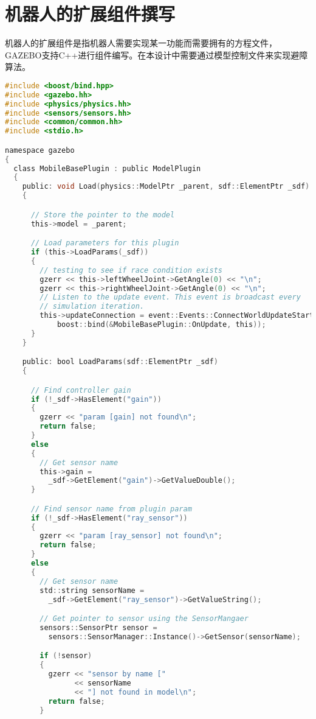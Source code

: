 \section{机器人的扩展组件撰写}
机器人的扩展组件是指机器人需要实现某一功能而需要拥有的方程文件，GAZEBO支持C++进行组件编写。在本设计中需要通过模型控制文件来实现避障算法。\\
\begin{lstlisting}[language={C}, caption={机器人控制扩展组件}]
#include <boost/bind.hpp>
#include <gazebo.hh>
#include <physics/physics.hh>
#include <sensors/sensors.hh>
#include <common/common.hh>
#include <stdio.h>

namespace gazebo
{   
  class MobileBasePlugin : public ModelPlugin
  {
    public: void Load(physics::ModelPtr _parent, sdf::ElementPtr _sdf) 
    {

      // Store the pointer to the model
      this->model = _parent;

      // Load parameters for this plugin
      if (this->LoadParams(_sdf))
      {
        // testing to see if race condition exists
        gzerr << this->leftWheelJoint->GetAngle(0) << "\n";
        gzerr << this->rightWheelJoint->GetAngle(0) << "\n";
        // Listen to the update event. This event is broadcast every
        // simulation iteration.
        this->updateConnection = event::Events::ConnectWorldUpdateStart(
            boost::bind(&MobileBasePlugin::OnUpdate, this));
      }
    }

    public: bool LoadParams(sdf::ElementPtr _sdf) 
    {

      // Find controller gain
      if (!_sdf->HasElement("gain"))
      {
        gzerr << "param [gain] not found\n";
        return false;
      }
      else
      {
        // Get sensor name
        this->gain =
          _sdf->GetElement("gain")->GetValueDouble();
      }

      // Find sensor name from plugin param
      if (!_sdf->HasElement("ray_sensor"))
      {
        gzerr << "param [ray_sensor] not found\n";
        return false;
      }
      else
      {
        // Get sensor name
        std::string sensorName =
          _sdf->GetElement("ray_sensor")->GetValueString();

        // Get pointer to sensor using the SensorMangaer
        sensors::SensorPtr sensor =
          sensors::SensorManager::Instance()->GetSensor(sensorName);

        if (!sensor)
        {
          gzerr << "sensor by name ["
                << sensorName
                << "] not found in model\n";
          return false;
        }


\end{lstlisting}
